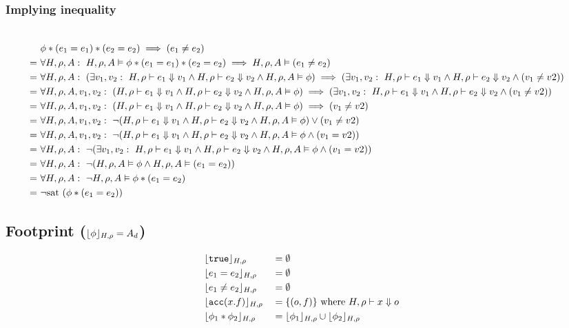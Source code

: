 \documentclass[11pt,a4paper]{article}
\begin{document}
\subsubsection{Implying inequality}
\begin{align*}
\\   & \phi * (e_1 = e_1) * (e_2 = e_2) \implies (e_1 \neq e_2)
\\ =~& \forall H, \rho, A:~ \evalphi \phi * (e_1 = e_1) * (e_2 = e_2) \implies \evalphi (e_1 \neq e_2)
\\ =~& \forall H, \rho, A:~  (\exists v_1, v_2:~ \evale {e_1} {v_1} \wedge \evale {e_2} {v_2} \wedge \evalphi \phi) \implies (\exists v_1, v_2:~ \evale {e_1} {v_1} \wedge \evale {e_2} {v_2} \wedge (v_1 \neq v2))
\\ =~& \forall H, \rho, A, v_1, v_2:~  (\evale {e_1} {v_1} \wedge \evale {e_2} {v_2} \wedge \evalphi \phi) \implies (\exists v_1, v_2:~ \evale {e_1} {v_1} \wedge \evale {e_2} {v_2} \wedge (v_1 \neq v2))
\\ =~& \forall H, \rho, A, v_1, v_2:~  (\evale {e_1} {v_1} \wedge \evale {e_2} {v_2} \wedge \evalphi \phi) \implies (v_1 \neq v2)
\\ =~& \forall H, \rho, A, v_1, v_2:~  \neg (\evale {e_1} {v_1} \wedge \evale {e_2} {v_2} \wedge \evalphi \phi) \vee (v_1 \neq v2)
\\ =~& \forall H, \rho, A, v_1, v_2:~  \neg (\evale {e_1} {v_1} \wedge \evale {e_2} {v_2} \wedge \evalphi \phi \wedge (v_1 = v2))
\\ =~& \forall H, \rho, A:~ \neg (\exists v_1, v_2:~ \evale {e_1} {v_1} \wedge \evale {e_2} {v_2} \wedge \evalphi \phi \wedge (v_1 = v2))
\\ =~& \forall H, \rho, A:~ \neg (\evalphi \phi \wedge \evalphi (e_1 = e_2))
\\ =~& \forall H, \rho, A:~ \neg \evalphi \phi * (e_1 = e_2)
\\ =~& \neg \text{sat~}(\phi * (e_1 = e_2))
\end{align*}

\subsection{Footprint ($\dynamicFP {H} {\rho} {\phi} = A_d$)}
\begin{align*}
 &\dynamicFP {H} {\rho} {\true}    		&&= \emptyset
\\ &\dynamicFP {H} {\rho} {e_1 = e_2}     	&&= \emptyset
\\ &\dynamicFP {H} {\rho} {e_1 \neq e_2}  	&&= \emptyset
\\ &\dynamicFP {H} {\rho} {\acc(x.f)} 		&&= \{(o,f)\} \text{ where } \evale x o
\\ &\dynamicFP {H} {\rho} {\phi_1 * \phi_2} &&= \dynamicFP {H} {\rho} {\phi_1} \cup \dynamicFP {H} {\rho} {\phi_2}
\end{align*}
\end{document}
